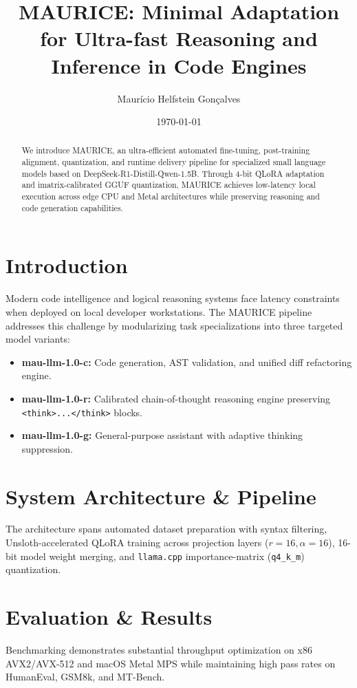 \documentclass[10pt,twocolumn,letterpaper]{article}
\title{MAURICE: Minimal Adaptation for Ultra-fast Reasoning and Inference in Code Engines}
\author{Maurício Helfstein Gonçalves}
\date{\today}
\begin{document}
\maketitle

\begin{abstract}
We introduce MAURICE, an ultra-efficient automated fine-tuning, post-training alignment, quantization, and runtime delivery pipeline for specialized small language models based on DeepSeek-R1-Distill-Qwen-1.5B. Through 4-bit QLoRA adaptation and imatrix-calibrated GGUF quantization, MAURICE achieves low-latency local execution across edge CPU and Metal architectures while preserving reasoning and code generation capabilities.
\end{abstract}

\section{Introduction}
Modern code intelligence and logical reasoning systems face latency constraints when deployed on local developer workstations. The MAURICE pipeline addresses this challenge by modularizing task specializations into three targeted model variants:
\begin{itemize}
    \item \textbf{mau-llm-1.0-c:} Code generation, AST validation, and unified diff refactoring engine.
    \item \textbf{mau-llm-1.0-r:} Calibrated chain-of-thought reasoning engine preserving \texttt{<think>...</think>} blocks.
    \item \textbf{mau-llm-1.0-g:} General-purpose assistant with adaptive thinking suppression.
\end{itemize}

\section{System Architecture \& Pipeline}
The architecture spans automated dataset preparation with syntax filtering, Unsloth-accelerated QLoRA training across projection layers ($r=16, \alpha=16$), 16-bit model weight merging, and \texttt{llama.cpp} importance-matrix (\texttt{q4\_k\_m}) quantization.

\section{Evaluation \& Results}
Benchmarking demonstrates substantial throughput optimization on x86 AVX2/AVX-512 and macOS Metal MPS while maintaining high pass rates on HumanEval, GSM8k, and MT-Bench.
\end{document}
